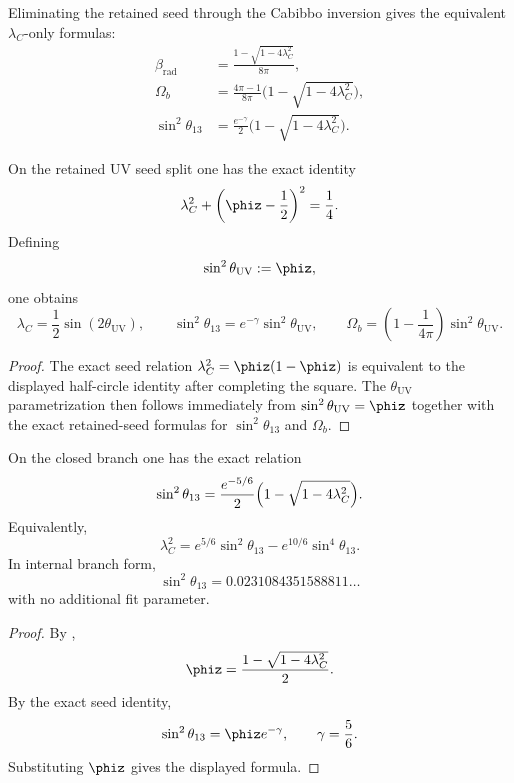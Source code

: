Eliminating the retained seed through the Cabibbo inversion gives the equivalent
$\lambda_C$-only formulas:
\begin{equation}
\label{eq:lambda-c-master}
\begin{aligned}
\beta_{\mathrm{rad}}&=\frac{1-\sqrt{1-4\lambda_C^2}}{8\pi},\\
\Omega_b&=\frac{4\pi-1}{8\pi}\bigl(1-\sqrt{1-4\lambda_C^2}\bigr),\\
\sin^2\theta_{13}&=\frac{e^{-\gamma}}{2}\bigl(1-\sqrt{1-4\lambda_C^2}\bigr).
\end{aligned}
\end{equation}

\begin{corollary}
\label{cor:uv-half-circle}
On the retained UV seed split one has the exact identity
\[
\lambda_C^2+\left(\phiz-\frac12\right)^2=\frac14.
\]
Defining
\[
\sin^2\theta_{\mathrm{UV}}:=\phiz,
\]
one obtains
\[
\lambda_C=\frac12\sin(2\theta_{\mathrm{UV}}),
\qquad
\sin^2\theta_{13}=e^{-\gamma}\sin^2\theta_{\mathrm{UV}},
\qquad
\Omega_b=\left(1-\frac{1}{4\pi}\right)\sin^2\theta_{\mathrm{UV}}.
\]
\end{corollary}

\begin{proof}
The exact seed relation $\lambda_C^2=\phiz(1-\phiz)$ is equivalent to the displayed half-circle
identity after completing the square. The $\theta_{\mathrm{UV}}$ parametrization then follows
immediately from $\sin^2\theta_{\mathrm{UV}}=\phiz$ together with the exact retained-seed formulas
for $\sin^2\theta_{13}$ and $\Omega_b$.
\end{proof}

\begin{corollary}
\label{cor:ckm-pmns-bridge-law}
On the closed branch one has the exact relation
\[
\sin^2\theta_{13}
=
\frac{e^{-5/6}}{2}\Bigl(1-\sqrt{1-4\lambda_C^2}\Bigr).
\]
Equivalently,
\[
\lambda_C^2=e^{5/6}\sin^2\theta_{13}-e^{10/6}\sin^4\theta_{13}.
\]
In internal branch form,
\[
\sin^2\theta_{13}=0.0231084351588811\ldots
\]
with no additional fit parameter.
\end{corollary}

\begin{proof}
By ,
\[
\phiz=\frac{1-\sqrt{1-4\lambda_C^2}}{2}.
\]
By the exact seed identity,
\[
\sin^2\theta_{13}=\phiz e^{-\gamma},
\qquad
\gamma=\frac56.
\]
Substituting $\phiz$ gives the displayed formula.
\end{proof}

